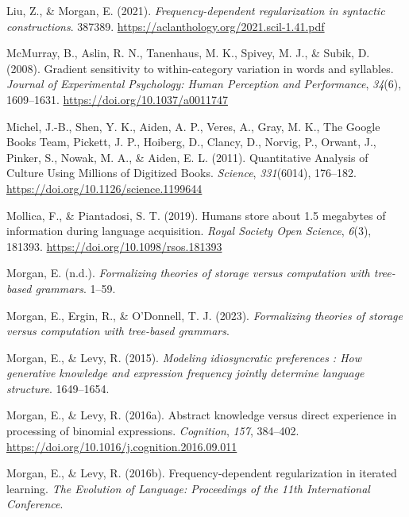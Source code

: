 \documentclass[
  12pt,
]{scrartcl}
\newlength{\cslhangindent}
\newenvironment{CSLReferences}[2] %
 {\begin{list}{}{%
  \setlength{\itemindent}{0pt}
  \setlength{\leftmargin}{0pt}
  \setlength{\parsep}{0pt}
  \ifodd #1
   \setlength{\leftmargin}{\cslhangindent}
   \setlength{\itemindent}{-1\cslhangindent}
  \fi
  \setlength{\itemsep}{#2\baselineskip}}}
 {\end{list}}
\begin{document}
\begin{CSLReferences}{1}{0}
Liu, Z., \& Morgan, E. (2021). \emph{Frequency-dependent regularization
in syntactic constructions}. 387389.
\url{https://aclanthology.org/2021.scil-1.41.pdf}

McMurray, B., Aslin, R. N., Tanenhaus, M. K., Spivey, M. J., \& Subik,
D. (2008). Gradient sensitivity to within-category variation in words
and syllables. \emph{Journal of Experimental Psychology: Human
Perception and Performance}, \emph{34}(6), 1609--1631.
\url{https://doi.org/10.1037/a0011747}

Michel, J.-B., Shen, Y. K., Aiden, A. P., Veres, A., Gray, M. K., The
Google Books Team, Pickett, J. P., Hoiberg, D., Clancy, D., Norvig, P.,
Orwant, J., Pinker, S., Nowak, M. A., \& Aiden, E. L. (2011).
Quantitative Analysis of Culture Using Millions of Digitized Books.
\emph{Science}, \emph{331}(6014), 176--182.
\url{https://doi.org/10.1126/science.1199644}

Mollica, F., \& Piantadosi, S. T. (2019). Humans store about 1.5
megabytes of information during language acquisition. \emph{Royal
Society Open Science}, \emph{6}(3), 181393.
\url{https://doi.org/10.1098/rsos.181393}

Morgan, E. (n.d.). \emph{Formalizing theories of storage versus
computation with tree-based grammars}. 1--59.

Morgan, E., Ergin, R., \& O'Donnell, T. J. (2023). \emph{Formalizing
theories of storage versus computation with tree-based grammars}.

Morgan, E., \& Levy, R. (2015). \emph{Modeling idiosyncratic preferences
: How generative knowledge and expression frequency jointly determine
language structure}. 1649--1654.

Morgan, E., \& Levy, R. (2016a). Abstract knowledge versus direct
experience in processing of binomial expressions. \emph{Cognition},
\emph{157}, 384--402.
\url{https://doi.org/10.1016/j.cognition.2016.09.011}

Morgan, E., \& Levy, R. (2016b). Frequency-dependent regularization in
iterated learning. \emph{The Evolution of Language: Proceedings of the
11th International Conference}.


\end{CSLReferences}
\end{document}
